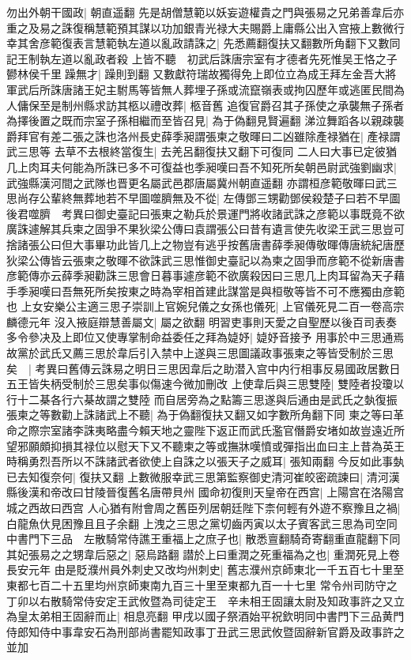 勿出外朝干國政|{
	朝直遥翻}
先是胡僧慧範以妖妄遊權貴之門與張易之兄弟善韋后亦重之及易之誅復稱慧範預其謀以功加銀青光禄大夫賜爵上庸縣公出入宫掖上數微行幸其舍彦範復表言慧範執左道以亂政請誅之|{
	先悉薦翻復扶又翻數所角翻下又數同記王制執左道以亂政者殺}
上皆不聽　初武后誅唐宗室有才德者先死惟吴王恪之子鬰林侯千里躁無才|{
	躁則到翻}
又數獻符瑞故獨得免上即位立為成王拜左金吾大將軍武后所誅唐諸王妃主駙馬等皆無人葬埋子孫或流竄嶺表或拘囚歷年或逃匿民間為人傭保至是制州縣求訪其柩以禮改葬|{
	柩音舊}
追復官爵召其子孫使之承襲無子孫者為擇後置之既而宗室子孫相繼而至皆召見|{
	為于偽翻見賢遍翻}
涕泣舞蹈各以親疎襲爵拜官有差二張之誅也洛州長史薛季昶謂張柬之敬暉曰二凶雖除產禄猶在|{
	產禄謂武三思等}
去草不去根終當復生|{
	去羌呂翻復扶又翻下可復同}
二人曰大事已定彼猶几上肉耳夫何能為所誅已多不可復益也季昶嘆曰吾不知死所矣朝邑尉武強劉幽求|{
	武強縣漢河間之武隊也晋更名屬武邑郡唐屬冀州朝直遥翻}
亦謂桓彦範敬暉曰武三思尚存公輩終無葬地若不早圖噬臍無及不從|{
	左傳鄧三甥勸鄧侯殺楚子曰若不早圖後君噬臍　考異曰御史臺記曰張東之勒兵於景運門將收諸武誅之彦範以事既竟不欲廣誅遽解其兵柬之固爭不果狄梁公傳曰袁謂張公曰昔有遺言使先收梁王武三思豈可捨諸張公曰但大事畢功此皆几上之物豈有逃乎按舊唐書薛季昶傳敬暉傳唐統紀唐歷狄梁公傳皆云張柬之敬暉不欲誅武三思惟御史臺記以為柬之固爭而彦範不從新唐書彦範傳亦云薛季昶勸誅三思會日暮事遽彦範不欲廣殺因曰三思几上肉耳留為天子藉手季昶嘆曰吾無死所矣按東之時為宰相首建此謀當是與桓敬等皆不可不應獨由彦範也}
上女安樂公主適三思子崇訓上官婉兒儀之女孫也儀死|{
	上官儀死見二百一卷高宗麟德元年}
沒入掖庭辯慧善屬文|{
	屬之欲翻}
明習吏事則天愛之自聖歷以後百司表奏多令參决及上即位又使專掌制命益委任之拜為媫妤|{
	媫妤音接予}
用事於中三思通焉故黨於武氏又薦三思於韋后引入禁中上遂與三思圖議政事張柬之等皆受制於三思矣　|{
	考異曰舊傳云誅易之明日三思因韋后之助潜入宫中内行相事反易國政居數日五王皆失柄受制於三思矣事似傷速今微加刪改}
上使韋后與三思雙陸|{
	雙陸者投瓊以行十二棊各行六棊故謂之雙陸}
而自居旁為之點籌三思遂與后通由是武氏之埶復振張柬之等數勸上誅諸武上不聽|{
	為于偽翻復扶又翻又如字數所角翻下同}
柬之等曰革命之際宗室諸李誅夷略盡今賴天地之靈陛下返正而武氏濫官僭爵安堵如故豈遠近所望邪願頗抑損其禄位以慰天下又不聽柬之等或撫牀嘆憤或彈指出血曰主上昔為英王時稱勇烈吾所以不誅諸武者欲使上自誅之以張天子之威耳|{
	張知兩翻}
今反如此事埶已去知復奈何|{
	復扶又翻}
上數微服幸武三思第監察御史清河崔皎密疏諫曰|{
	清河漢縣後漢和帝改曰甘陵晉復舊名唐帶貝州}
國命初復則天皇帝在西宫|{
	上陽宫在洛陽宫城之西故曰西宫}
人心猶有附會周之舊臣列居朝廷陛下柰何輕有外遊不察豫且之禍|{
	白龍魚㐲見困豫且且子余翻}
上洩之三思之黨切齒丙寅以太子賓客武三思為司空同中書門下三品　左散騎常侍譙王重福上之庶子也|{
	散悉亶翻騎奇寄翻重直龍翻下同}
其妃張易之之甥韋后惡之|{
	惡烏路翻}
譛於上曰重潤之死重福為之也|{
	重潤死見上卷長安元年}
由是貶濮州員外刺史又改均州刺史|{
	舊志濮州京師東北一千五百七十里至東都七百二十五里均州京師東南九百三十里至東都九百一十七里}
常令州司防守之　丁卯以右散騎常侍安定王武攸暨為司徒定王　辛未相王固讓太尉及知政事許之又立為皇太弟相王固辭而止|{
	相息亮翻}
甲戌以國子祭酒始平祝欽明同中書門下三品黄門侍郎知侍中事韋安石為刑部尚書罷知政事丁丑武三思武攸暨固辭新官爵及政事許之並加

